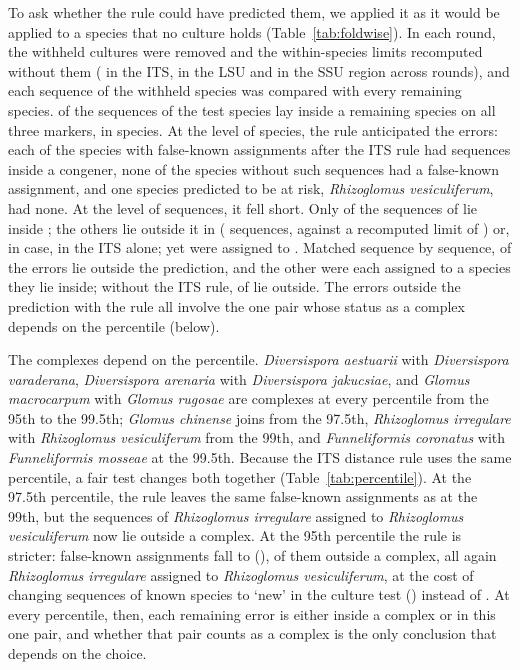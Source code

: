 \documentclass[11pt]{article}
\newcommand{\spn}[1]{\emph{#1}}   %
\begin{document}
To ask whether the rule could have predicted them, we applied it as it would be applied to a species that no culture
holds (Table~\ref{tab:foldwise}). In each round, the withheld cultures were removed and the within-species limits
recomputed without them (\FwTITSRange{} in the ITS, \FwTLSURange{} in the LSU and \FwTSSURange{} in the SSU region
across rounds), and each sequence of the withheld species was compared with every remaining species. \FwInsideCopies{}
of the \FwCopies{} sequences of the test species lay inside a remaining species on all three markers, in
\FwInsideSpecies{} species. At the level of species, the rule anticipated the errors: each of the
\FwFKSpeciesVTwo{} species with false-known assignments after the ITS rule had sequences inside a congener, none of
the \FwNoInsideSpecies{} species without such sequences had a false-known assignment, and one species predicted to be
at risk, \spn{Rhizoglomus vesiculiferum}, had none. At the level of sequences, it fell short. Only \FwExInside{} of
the \FwExCopies{} sequences of \FwExSpecies{} lie inside \FwExPartner{}; the others lie outside it in \FwExMarker{}
(\FwExFarN{} sequences, \FwExRange{} against a recomputed limit of \FwExT{}) or, in \FwExOtherN{} case, in the ITS
alone; yet \FwExFK{} were assigned to \FwExPartner{}. Matched sequence by sequence, \FwCopyOutsideVTwo{} of the
\FwFKVTwo{} errors lie outside the prediction, and the other \FwCopyInsideVTwo{} were each assigned to a species they
lie inside; without the ITS rule, \FwCopyOutsideVOne{} of \MfourFKvOne{} lie outside. The errors outside the
prediction with the rule all involve the one pair whose status as a complex depends on the percentile (below).


The complexes depend on the percentile. \spn{Diversispora aestuarii} with \spn{Diversispora varaderana},
\spn{Diversispora arenaria} with \spn{Diversispora jakucsiae}, and \spn{Glomus macrocarpum} with \spn{Glomus
rugosae} are complexes at every percentile from the 95th to the 99.5th; \spn{Glomus chinense} joins from the 97.5th,
\spn{Rhizoglomus irregulare} with \spn{Rhizoglomus vesiculiferum} from the 99th, and \spn{Funneliformis coronatus}
with \spn{Funneliformis mosseae} at the 99.5th. Because the ITS distance rule uses the same percentile, a fair test
changes both together (Table~\ref{tab:percentile}). At the 97.5th percentile, the rule leaves the same
\PctNinetySevenHalfFK{} false-known assignments as at the 99th, but the \RirrVesN{} sequences of \spn{Rhizoglomus
irregulare} assigned to \spn{Rhizoglomus vesiculiferum} now lie outside a complex. At the 95th percentile the rule is
stricter: false-known assignments fall to \PctNinetyFiveFK{} (\PctNinetyFiveFKPct{}), \PctNinetyFiveOutside{} of
them outside a complex, all again \spn{Rhizoglomus irregulare} assigned to \spn{Rhizoglomus vesiculiferum}, at the
cost of changing \PctNinetyFiveKnownDemoted{} sequences of known species to `new' in the culture test
(\PctNinetyFiveKnownDemotedPct{}) instead of \PctNinetyNineKnownDemoted{}. At every percentile, then, each remaining
error is either inside a complex or in this one pair, and whether that pair counts as a complex is the only
conclusion that depends on the choice.
\end{document}
